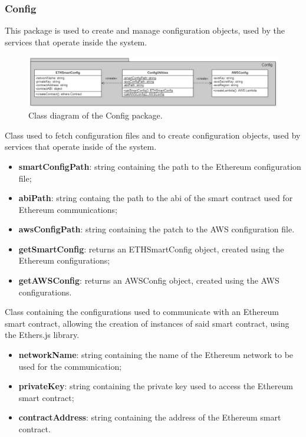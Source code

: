 	\subsubsection{Config}
	This package is used to create and manage configuration objects, used by the services that operate inside the system.
	\begin{figure} [h!]
		\centering
		\includegraphics[width=1\linewidth]{diagrammi/etherless-server/Config}
		\caption{Class diagram of the Config package.}
	\end{figure}
	Class used to fetch configuration files and to create configuration objects, used by services that operate inside of the system.
	\begin{itemize}
		\item \textbf{smartConfigPath}: string containing the path to the Ethereum configuration file;
		\item \textbf{abiPath}: string containg the path to the abi of the smart contract used for Ethereum communications;
		\item \textbf{awsConfigPath}: string containing the patch to the AWS configuration file.
	\end{itemize}
	\begin{itemize}
		\item \textbf{getSmartConfig}: returns an ETHSmartConfig object, created using the Ethereum configurations;
		\item \textbf{getAWSConfig}: returns an AWSConfig object, created using the AWS configurations.
	\end{itemize}
	Class containing the configurations used to communicate with an Ethereum smart contract, allowing the creation of instances of said smart contract, using the Ethers.js library.
	\begin{itemize}
		\item \textbf{networkName}: string containing the name of the Ethereum network to be used for the communication;
		\item \textbf{privateKey}: string containing the private key used to access the Ethereum smart contract;
		\item \textbf{contractAddress}: string containing the address of the Ethereum smart contract.
	\end{itemize}
